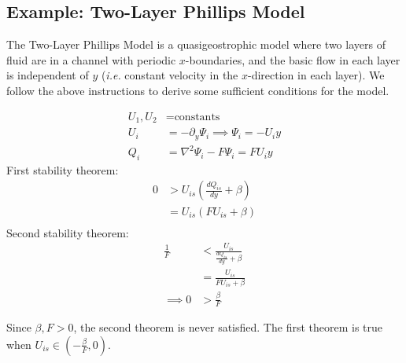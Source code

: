 \documentclass[12pt]{article}
\begin{document}
{    \subsection{Example: Two-Layer Phillips Model}{
        The Two-Layer Phillips Model is a quasigeostrophic model where two layers of fluid are in a channel with periodic $x$-boundaries, and the basic flow in each layer is independent of $y$ (\emph{i.e.} constant velocity in the $x$-direction in each layer). We follow the above instructions to derive some sufficient conditions for the model.

        \begin{align*}
            U_1, U_2 &= \text{constants} \\
            U_i &= -\partial_y \Psi_i \implies \Psi_i = -U_i y \\
            Q_i &= \nabla^2\Psi_i - F\Psi_i = F U_i y
        \end{align*}
        First stability theorem:
        \begin{align*}
            0 &> U_{is} \left(\frac{d Q_{is}}{dy} + \beta \right) \\
            &= U_{is} (F U_{is} + \beta) \\
        \end{align*}
        Second stability theorem:
        \begin{align*}
            \frac1F &< \frac{U_{is}}{\frac{d Q_{is}}{dy} + \beta} \\
            &= \frac{U_{is}}{F U_{is} + \beta} \\
            \implies 0 &> \frac{\beta}{F}
        \end{align*}

        Since $\beta, F > 0$, the second theorem is never satisfied. The first theorem is true when $U_{is} \in (-\frac{\beta}{F}, 0)$.
    }   
}

\newpage
\end{document}
